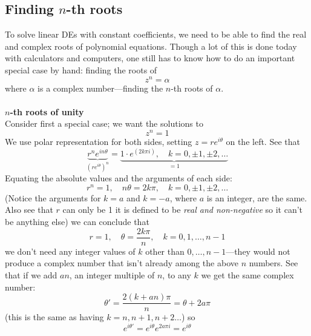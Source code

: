 \documentclass{report}
\begin{document}
\subsection{Finding $n$-th roots}
To solve linear DEs with constant coefficients, we need to be able to find the real and complex roots of polynomial
equations. Though a lot of this is done today with calculators and computers, one
still has to know how to do an important special case by hand: finding the roots of 
\begin{equation*}
z^n=\alpha
\end{equation*}
where $\alpha$ is a complex number---finding the $n$-th roots of $\alpha$.\\
\vspace{1mm}\\
\textbf{$n$-th roots of unity}\\
Consider first a special case; we want the solutions to
\begin{equation*}
z^n=1
\end{equation*}
We use polar representation for both sides, setting $z=re^{i\theta}$ on the left. See that
\begin{equation*}
\underbrace{r^ne^{in\theta}}_{(re^{i\theta})^n}
=\underbrace{1\cdot e^{(2k\pi i)},\quad k=0,\pm1,\pm2,\ldots}_{=1}
\end{equation*}
Equating the absolute values and the arguments of each side:
\begin{equation*}
r^n=1,\quad n\theta=2k\pi,\quad k=0,\pm1,\pm2,\ldots
\end{equation*}
(Notice the arguments for $k=a$ and $k=-a$, where $a$ is an integer, are the same.
Also see that $r$ can only be 1 it is defined to be \textit{real and non-negative} 
so it can't be anything else) we can conclude that
\begin{equation*}
r=1,\quad\theta=\frac{2k\pi}{n},\quad k=0,1,\ldots,n-1
\end{equation*}
we don't need any integer values of $k$ other than $0,\ldots,n-1$---they would not produce a complex number
that isn't already among the above $n$ numbers. See that if we add $an$, an integer multiple of $n$,
to any $k$ we get the same complex number:
\begin{equation*}
\theta'=\frac{2(k+an)\pi}{n}=\theta+2a\pi\end{equation*}
(this is the same as having $k=n,n+1,n+2\ldots$) so
\begin{equation*}
e^{i\theta'}=e^{i\theta}e^{2a\pi i}=e^{i\theta}
\end{equation*}
\end{document}
